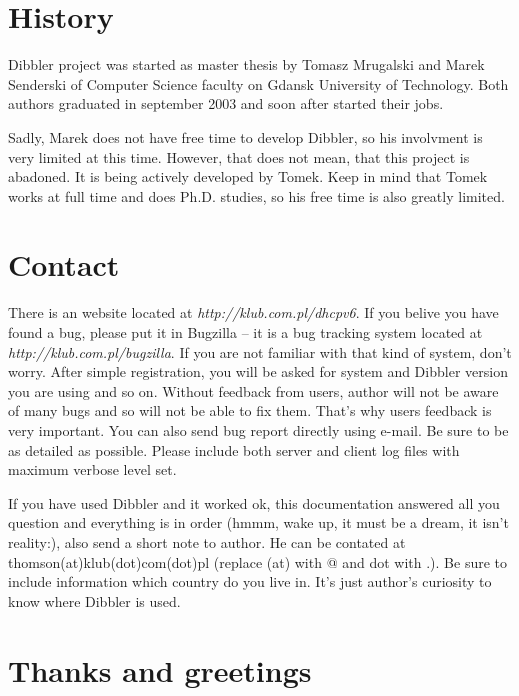 \section{History}
 Dibbler project was started as master thesis by Tomasz Mrugalski and
Marek Senderski of  Computer Science faculty on Gdansk University of
Technology. Both authors graduated in september 2003 and soon after
started their jobs. 

Sadly, Marek does not have free time to develop Dibbler, so his
involvment is very limited at this time. However, that does not mean,
that this project is abadoned. It is being actively developed by
Tomek. Keep in mind that Tomek works at full time and does
Ph.D. studies, so his free time is also greatly limited.

\section{Contact}
There is an website located at \emph{http://klub.com.pl/dhcpv6}. If
you belive you have found a bug, please put it in Bugzilla -- it is a
bug tracking system located at \emph{http://klub.com.pl/bugzilla}. If
you are not familiar with that kind of system, don't worry. After
simple registration, you will be asked for system and Dibbler version
you are using and so on. Without feedback from users, author will not
be aware of many bugs and so will not be able to fix them. That's why
users feedback is very important. You can also send bug report
directly using e-mail. Be sure to be as detailed as possible. Please
include both server and client log files with maximum verbose level
set. 

If you have used Dibbler and it worked ok, this documentation answered
all you question and everything is in order (hmmm, wake up, it must be
a dream, it isn't reality:), also send a short note to author. He can
be contated at thomson(at)klub(dot)com(dot)pl (replace (at) with @ and
dot with .). Be sure to include information which country do you live
in. It's just author's curiosity to know where Dibbler is used.

\section{Thanks and greetings}

